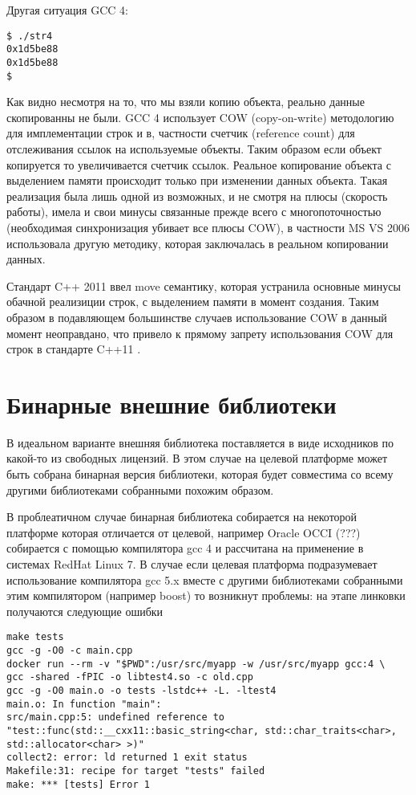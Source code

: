\documentclass[14pt,a4paper]{article}
\begin{document}
Другая ситуация GCC 4:
\begin{verbatim}
$ ./str4
0x1d5be88
0x1d5be88
$
\end{verbatim}

Как видно несмотря на то, что мы взяли копию объекта, реально данные
скопированны не были. GCC 4 использует COW (copy-on-write) методологию
для имплементации строк и в, частности счетчик (reference count) для
отслеживания ссылок на используемые объекты. Таким образом если объект
копируется то увеличивается счетчик ссылок. Реальное копирование
объекта с выделением памяти происходит только при изменении данных
объекта. Такая реализация была
лишь одной из возможных, и не смотря на плюсы (скорость работы), имела
и свои минусы связанные прежде всего с многопоточностью (необходимая
синхронизация убивает все плюсы COW), в частности MS VS 2006
использовала другую методику, которая заключалась в реальном
копировании данных. 

Стандарт C++ 2011 ввел move семантику, которая устранила основные
минусы обачной реализиции строк, с выделением памяти в момент
создания. Таким образом в подавляющем большинстве случаев
использование COW в данный момент неоправдано, что привело к прямому
запрету использования COW для строк в стандарте C++11 \cite{cpp11}.

\section{Бинарные внешние библиотеки}

В идеальном варианте внешняя библиотека поставляется в виде исходников
по какой-то из свободных лицензий. В этом случае на целевой
платформе может быть собрана бинарная версия библиотеки, которая будет
совместима со всему другими библиотеками собранными похожим образом.

В проблеатичном случае бинарная библиотека собирается на некоторой
платформе которая отличается от целевой, например Oracle OCCI (???)
собирается с помощью компилятора gcc 4 и рассчитана на применение в
системах RedHat Linux 7. В случае если целевая платформа подразумевает
использование компилятора gcc 5.x вместе с другими библиотеками
собранными этим компилятором (например boost) то возникнут проблемы:
на этапе линковки получаются следующие ошибки

\begin{verbatim}
make tests
gcc -g -O0 -c main.cpp 
docker run --rm -v "$PWD":/usr/src/myapp -w /usr/src/myapp gcc:4 \
gcc -shared -fPIC -o libtest4.so -c old.cpp
gcc -g -O0 main.o -o tests -lstdc++ -L. -ltest4
main.o: In function "main":
src/main.cpp:5: undefined reference to 
"test::func(std::__cxx11::basic_string<char, std::char_traits<char>, 
std::allocator<char> >)"
collect2: error: ld returned 1 exit status
Makefile:31: recipe for target "tests" failed
make: *** [tests] Error 1
\end{verbatim}
\end{document}
